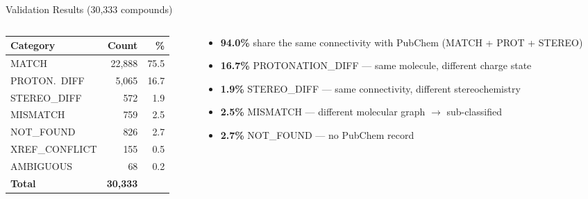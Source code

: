 \documentclass[aspectratio=169,11pt]{beamer}
\begin{document}
\begin{frame}{Validation Results (30,333 compounds)}

\begin{columns}[T]
\begin{column}{0.42\textwidth}
\begin{table}[h]
\centering
\small
\begin{tabular}{lrr}
\toprule
\textbf{Category} & \textbf{Count} & \textbf{\%} \\
\midrule
MATCH             & 22,888 & 75.5 \\
PROTON.\ DIFF     &  5,065 & 16.7 \\
STEREO\_DIFF      &    572 &  1.9 \\
MISMATCH          &    759 &  2.5 \\
NOT\_FOUND        &    826 &  2.7 \\
XREF\_CONFLICT    &    155 &  0.5 \\
AMBIGUOUS         &     68 &  0.2 \\
\midrule
\textbf{Total}    & \textbf{30,333} & \\
\bottomrule
\end{tabular}
\end{table}
\end{column}

\begin{column}{0.54\textwidth}
\begin{itemize}\setlength\itemsep{5pt}
  \item \textbf{94.0\%} share the same connectivity
        with PubChem (MATCH + PROT + STEREO)
  \item \textbf{16.7\%} PROTONATION\_DIFF --- same molecule,
        different charge state
  \item \textbf{1.9\%} STEREO\_DIFF --- same connectivity,
        different stereochemistry
  \item \textbf{2.5\%} MISMATCH --- different molecular
        graph $\to$ sub-classified
  \item \textbf{2.7\%} NOT\_FOUND --- no PubChem record
\end{itemize}
\end{column}
\end{columns}

\end{frame}
\end{document}
